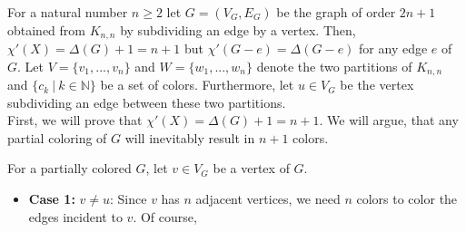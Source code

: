 \documentclass[a4paper]{article}
\begin{document}
	\begin{solution}{10}
		\begin{theorem}{For a natural number $n \geq 2$ let $G = (V_G, E_G)$ be the graph of order $2n + 1$ obtained from $K_{n,n}$ by subdividing an edge by a vertex. Then, $\chi'(X) = \Delta(G) + 1 = n + 1$ but $\chi'(G - e) = \Delta(G - e)$ for any edge $e$ of $G$.}
			Let $V = \{v_1, ..., v_n\}$ and $W = \{w_1, ..., w_n\}$ denote the two partitions of $K_{n, n}$ and $\{c_k\ |\ k \in \mathbb{N}\}$ be a set of colors. Furthermore, let $u \in V_G$ be the vertex subdividing an edge between these two partitions.\\
		
			First, we will prove that $\chi'(X) = \Delta(G) + 1 = n + 1$. We will argue, that any partial coloring of $G$ will inevitably result in $n+1$ colors. 
%

			\begin{center}
			\end{center}

			For a partially colored $G$, let $v \in V_G$ be a vertex of $G$.
			\begin{itemize}
				\item \textbf{Case 1:} $v \neq u$: Since $v$ has $n$ adjacent vertices, we need $n$ colors to color the edges incident to $v$. Of course, 
			\end{itemize}
		\end{theorem}
	\end{solution} 
\end{document}
